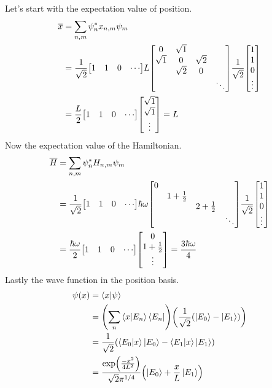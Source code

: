 \documentclass[boxes,pages]{homework}
\makeatletter
\numberwithin{@problem}{section}
\makeatother
\begin{document}
\begin{solution}
	Let's start with the expectation value of position.
	\begin{align*}
		\overline{x} & = \sum_{n, m}\psi_n^*x_{n,m}\psi_m \\
		& = \frac{1}{\sqrt{2}}\mqty[1 & 1 & 0 & \cdots]L\mqty[0 & \sqrt{1} & \\ \sqrt{1} & 0 & \sqrt{2} \\ & \sqrt{2} & 0 \\ & & & \ddots]\frac{1}{\sqrt{2}}\mqty[1 \\ 1 \\ 0 \\ \vdots] \\
		& = \frac{L}{2}\mqty[1 & 1 & 0 & \cdots]\mqty[\sqrt{1} \\ \sqrt{1} \\ \vdots] = L
	\end{align*}
	Now the expectation value of the Hamiltonian.
	\begin{align*}
		\overline{H} & = \sum_{n, m}\psi_n^*H_{n,m}\psi_m \\
		  & = \frac{1}{\sqrt{2}}\mqty[1    & 1 & 0 & \cdots]\hbar\omega\mqty[\dmat{0,1+\frac{1}{2},2 + \frac{1}{2}, \ddots}]\frac{1}{\sqrt{2}}\mqty[1 \\ 1 \\ 0 \\ \vdots] \\
		  & = \frac{\hbar\omega}{2}\mqty[1 & 1 & 0 & \cdots]\mqty[0                                                                                   \\ 1 + \frac{1}{2} \\ \vdots] = \frac{3\hbar\omega}{4}
	\end{align*}
	Lastly the wave function in the position basis.
	\begin{align*}
		\psi(x) & = \braket{x}{\psi}                                                                        \\
		        & = \qty(\sum_n\braket{x}{E_n}\bra{E_n})\qty(\frac{1}{\sqrt{2}}\qty(\ket{E_0} - \ket{E_1})) \\
		        & = \frac{1}{\sqrt{2}}\qty(\braket{E_0}{x}\ket{E_0} - \braket{E_1}{x}\ket{E_1})             \\
		        & = \frac{\exp(\frac{-x^2}{4L^2})}{\sqrt{2}\pi^{1/4}}\qty(\ket{E_0} + \frac{x}{L}\ket{E_1})
	\end{align*}
\end{solution}
\end{document}
